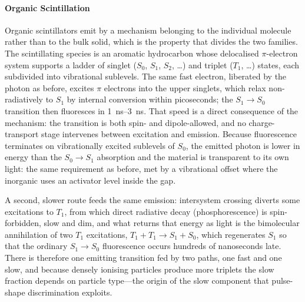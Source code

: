 \clearpage

\paragraph{Organic Scintillation}
Organic scintillators emit by a mechanism belonging to the individual molecule rather than to the bulk solid, which is the property that divides the two families.
The scintillating species is an aromatic hydrocarbon whose delocalised $\pi$-electron system supports a ladder of singlet ($S_0$, $S_1$, $S_2$, \dots) and triplet ($T_1$, \dots) states, each subdivided into vibrational sublevels.
The same fast electron, liberated by the  photon as before, excites $\pi$ electrons into the upper singlets, which relax non-radiatively to $S_1$ by internal conversion within picoseconds; the $S_1 \rightarrow S_0$ transition then fluoresces in \qtyrange{1}{3}{\nano\second}.
That speed is a direct consequence of the mechanism: the transition is both spin- and dipole-allowed, and no charge-transport stage intervenes between excitation and emission.
Because fluorescence terminates on vibrationally excited sublevels of $S_0$, the emitted photon is lower in energy than the $S_0 \rightarrow S_1$ absorption and the material is transparent to its own light: the same requirement as before, met by a vibrational offset where the inorganic uses an activator level inside the gap.

A second, slower route feeds the same emission: intersystem crossing diverts some excitations to $T_1$, from which direct radiative decay (phosphorescence) is spin-forbidden, slow and dim, and what returns that energy as light is the bimolecular annihilation of two $T_1$ excitations, $T_1 + T_1 \rightarrow S_1 + S_0$, which regenerates $S_1$ so that the ordinary $S_1 \rightarrow S_0$ fluorescence occurs hundreds of nanoseconds late.
There is therefore one emitting transition fed by two paths, one fast and one slow, and because densely ionising particles produce more triplets the slow fraction depends on particle type---the origin of the slow component that pulse-shape discrimination exploits.

